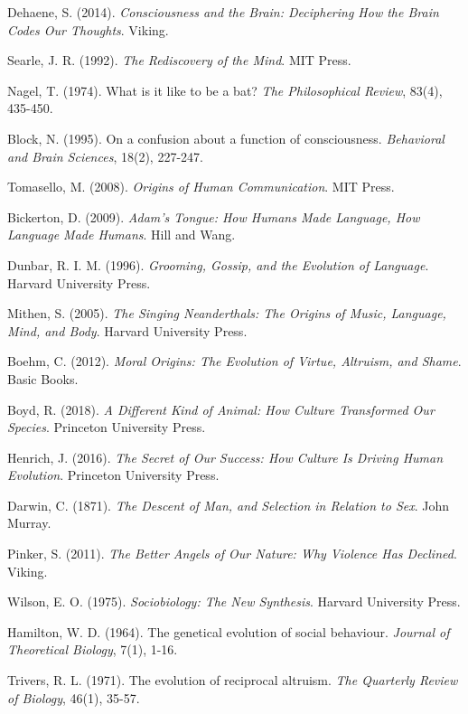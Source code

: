 \documentclass[12pt]{article}
\begin{document}
\begin{thebibliography}{99}
 Dehaene, S. (2014). \textit{Consciousness and the Brain: Deciphering How the Brain Codes Our Thoughts}. Viking.

 Searle, J. R. (1992). \textit{The Rediscovery of the Mind}. MIT Press.

 Nagel, T. (1974). What is it like to be a bat? \textit{The Philosophical Review}, 83(4), 435-450.

 Block, N. (1995). On a confusion about a function of consciousness. \textit{Behavioral and Brain Sciences}, 18(2), 227-247.

 Tomasello, M. (2008). \textit{Origins of Human Communication}. MIT Press.

 Bickerton, D. (2009). \textit{Adam's Tongue: How Humans Made Language, How Language Made Humans}. Hill and Wang.

 Dunbar, R. I. M. (1996). \textit{Grooming, Gossip, and the Evolution of Language}. Harvard University Press.

 Mithen, S. (2005). \textit{The Singing Neanderthals: The Origins of Music, Language, Mind, and Body}. Harvard University Press.

 Boehm, C. (2012). \textit{Moral Origins: The Evolution of Virtue, Altruism, and Shame}. Basic Books.

 Boyd, R. (2018). \textit{A Different Kind of Animal: How Culture Transformed Our Species}. Princeton University Press.

 Henrich, J. (2016). \textit{The Secret of Our Success: How Culture Is Driving Human Evolution}. Princeton University Press.

 Darwin, C. (1871). \textit{The Descent of Man, and Selection in Relation to Sex}. John Murray.

 Pinker, S. (2011). \textit{The Better Angels of Our Nature: Why Violence Has Declined}. Viking.

 Wilson, E. O. (1975). \textit{Sociobiology: The New Synthesis}. Harvard University Press.

 Hamilton, W. D. (1964). The genetical evolution of social behaviour. \textit{Journal of Theoretical Biology}, 7(1), 1-16.

 Trivers, R. L. (1971). The evolution of reciprocal altruism. \textit{The Quarterly Review of Biology}, 46(1), 35-57.


\end{thebibliography}
\end{document}
